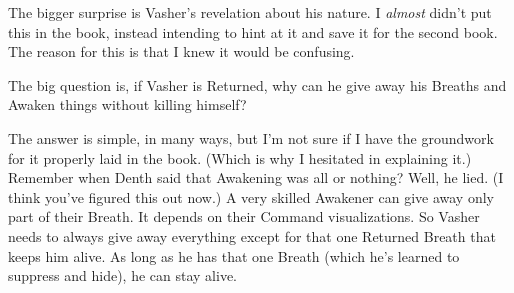 The bigger surprise is Vasher’s revelation about his nature. I \textit{almost} didn’t put this in the book, instead intending to hint at it and save it for the second book. The reason for this is that I knew it would be confusing.

The big question is, if Vasher is Returned, why can he give away his Breaths and Awaken things without killing himself?

The answer is simple, in many ways, but I’m not sure if I have the groundwork for it properly laid in the book. (Which is why I hesitated in explaining it.) Remember when Denth said that Awakening was all or nothing? Well, he lied. (I think you’ve figured this out now.) A very skilled Awakener can give away only part of their Breath. It depends on their Command visualizations. So Vasher needs to always give away everything except for that one Returned Breath that keeps him alive. As long as he has that one Breath (which he’s learned to suppress and hide), he can stay alive.



